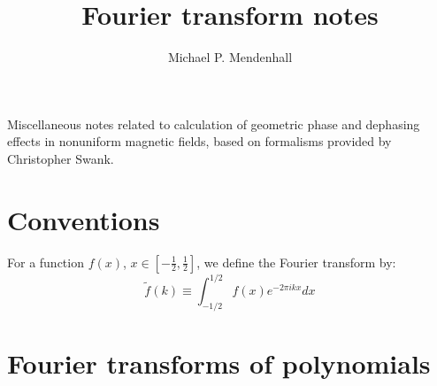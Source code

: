 \documentclass[11pt,english]{article}
\begin{document}
\title{Fourier transform notes}
\author{Michael P. Mendenhall}
\maketitle

Miscellaneous notes related to calculation of geometric phase and dephasing effects in
	nonuniform magnetic fields, based on formalisms provided by Christopher Swank.

\section{Conventions}

For a function $f(x)$, $x \in \left[ -\frac{1}{2}, \frac{1}{2} \right]$, we define the Fourier transform by:
\begin{equation}
	\tilde f(k) \equiv \int_{-1/2}^{1/2} f(x) e^{-2\pi i k x} dx
\end{equation}

\section{Fourier transforms of polynomials}
\end{document}

